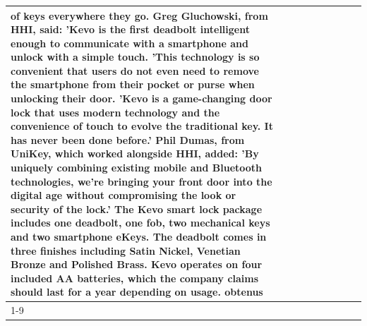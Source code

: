 \begin{table}[H]
\begin{tabular}{lllrlllll}
of keys everywhere they go. Greg Gluchowski, from HHI, said: 'Kevo is the first deadbolt intelligent enough to communicate with a smartphone and unlock with a simple touch. 'This technology is so convenient that users do not even need to remove the smartphone from their pocket or purse when unlocking their door. 'Kevo is a game-changing door lock that uses modern technology and the convenience of touch to evolve the traditional key. It has never been done before.' Phil Dumas, from UniKey, which worked alongside HHI, added: 'By uniquely combining existing mobile and Bluetooth technologies, we’re bringing your front door into the digital age without compromising the look or security of the lock.' The Kevo smart lock package includes one deadbolt, one fob, two mechanical keys and two smartphone eKeys. The deadbolt comes in three finishes including Satin Nickel, Venetian Bronze and Polished Brass. Kevo operates on four included AA batteries, which the company claims should last for a year depending on usage. obtenus \\
\cline{1-9}
\bottomrule
\end{tabular}
\end{table}

